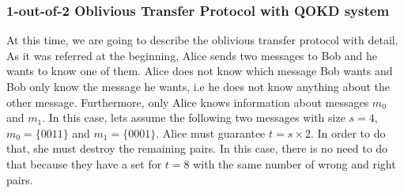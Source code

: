 \subsubsection{1-out-of-2 Oblivious Transfer Protocol with QOKD system}
    At this time, we are going to describe the oblivious transfer protocol with detail. As it was referred at the beginning, Alice sends two messages to Bob and he wants to know one of them. Alice does not know which message Bob wants and Bob only know the message he wants, i.e he does not know anything about the other message.
    Furthermore, only Alice knows information about messages $m_{0}$ and $m_{1}$.
    In this case, lets assume the following two messages with size $s=4$, $m_{0} = \{0 0 1 1\}$ and $m_{1} = \{0 0 0 1\}$.
    Alice must guarantee $t = s \times 2$. In order to do that, she must destroy the remaining pairs. In this case, there is no need to do that because they have a set for $t=8$ with the same number of wrong and right pairs.

